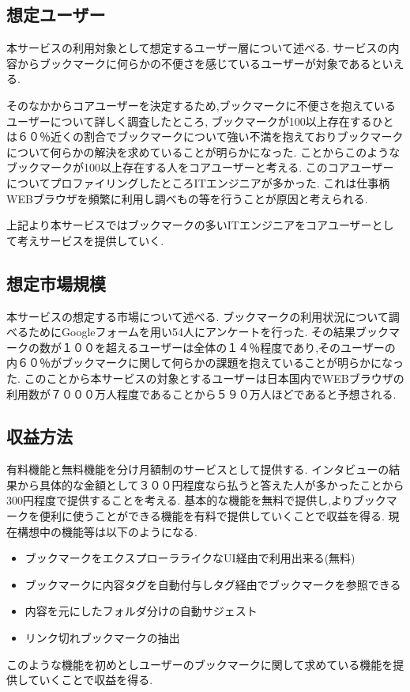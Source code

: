 \documentclass[a4paper,10pt,fleqn]{jsarticle}
\begin{document}
\subsection{想定ユーザー}
本サービスの利用対象として想定するユーザー層について述べる.
サービスの内容からブックマークに何らかの不便さを感じているユーザーが対象であるといえる.
\par そのなかからコアユーザーを決定するため,ブックマークに不便さを抱えているユーザーについて詳しく調査したところ, ブックマークが100以上存在するひとは６０％近くの割合でブックマークについて強い不満を抱えておりブックマークについて何らかの解決を求めていることが明らかになった. ことからこのようなブックマークが100以上存在する人をコアユーザーと考える. このコアユーザーについてプロファイリングしたところITエンジニアが多かった. これは仕事柄WEBブラウザを頻繁に利用し調べもの等を行うことが原因と考えられる.
\par 上記より本サービスではブックマークの多いITエンジニアをコアユーザーとして考えサービスを提供していく.  

\subsection{想定市場規模}
本サービスの想定する市場について述べる.
ブックマークの利用状況について調べるためにGoogleフォームを用い54人にアンケートを行った.
その結果ブックマークの数が１００を超えるユーザーは全体の１４％程度であり,そのユーザーの内６０％がブックマークに関して何らかの課題を抱えていることが明らかになった.
このことから本サービスの対象とするユーザーは日本国内でWEBブラウザの利用数が７０００万人程度であることから５９０万人ほどであると予想される.

\subsection{収益方法}
有料機能と無料機能を分け月額制のサービスとして提供する.
インタビューの結果から具体的な金額として３００円程度なら払うと答えた人が多かったことから300円程度で提供することを考える.
基本的な機能を無料で提供し,よりブックマークを便利に使うことができる機能を有料で提供していくことで収益を得る.
現在構想中の機能等は以下のようになる.
\begin{itemize}
  \item ブックマークをエクスプローラライクなUI経由で利用出来る(無料)
  \item ブックマークに内容タグを自動付与しタグ経由でブックマークを参照できる
  \item 内容を元にしたフォルダ分けの自動サジェスト
  \item リンク切れブックマークの抽出
\end{itemize}
このような機能を初めとしユーザーのブックマークに関して求めている機能を提供していくことで収益を得る.
\end{document}
